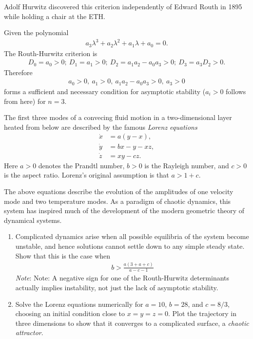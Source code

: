 \begin{remark}[]
	Adolf Hurwitz discovered this criterion independently of Edward Routh in 1895 while holding a chair at the ETH.
\end{remark}

\begin{ex}
	Given the polynomial
	\begin{align}
		a_3 \lambda ^3 + a_2 \lambda^2 + a_1 \lambda + a_0 = 0.
	\end{align}
	The Routh-Hurwitz criterion is
	\begin{align}
	D_0 = a_0 > 0;\ D_1 = a_1 >0;\ D_2 = a_1 a_2 - a_0 a_3>0;\ D_3 = a_3 D_2 >0.	
	\end{align}
	Therefore 
	\begin{align}
		\boxed{
			a_0> 0,\ a_1 > 0,\ a_1a_2 - a_0a_3 > 0,\ a_3 > 0
		}
	\end{align}
	forms a sufficient and necessary condition for asymptotic stability ($a_i >0$ follows from here) for $n=3$.
\end{ex}

\begin{exercise}
The first three modes of a convecing fluid motion in a two-dimensional layer heated from below are described by the famous \emph{Lorenz equations}
\begin{align}
	\dot{x} &= a(y - x), \\
	\dot{y} &= bx - y - xz, \\
	\dot{z} &= xy - cz.
\end{align}
Here $a>0$ denotes the Prandtl number, $b>0$ is the Rayleigh number, and $c>0$ is the aspect ratio. Lorenz's original assumption is that $a > 1 + c$.

The above equations describe the evolution of the amplitudes of one velocity mode and two temperature modes. As a paradigm of chaotic dynamics, this system has inspired much of the development of the modern geometric theory of dynamical systems.

\begin{enumerate}[label=(\alph*)]
	\item Complicated dynamics arise when all possible equilibria of the system become unstable, and hence solutions cannot settle down to any simple steady state. Show that this is the case when
	\begin{align}
		b > \frac{a(3 + a + c)}{a - c - 1}
	\end{align}
	\textit{Note}: Note: A negative sign for one of the Routh-Hurwitz determinants actually implies instability, not just the lack of asymptotic stability.
	\item Solve the Lorenz equations numerically for $a=10$, $b=28$, and $c=8/3$, choosing an initial condition close to $x=y=z=0$. Plot the trajectory in three dimensions to show that it converges to a complicated surface, a \emph{chaotic attractor}.
\end{enumerate}
\end{exercise}

